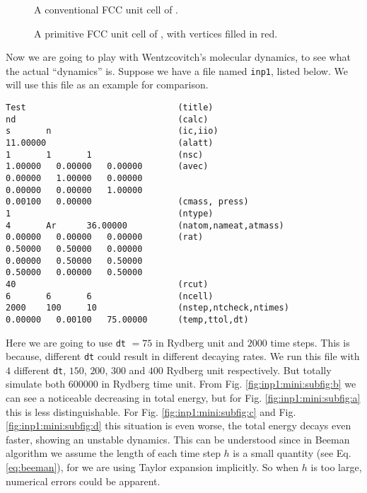 \begin{figure}[H]
	\begin{minipage}[t]{0.48\textwidth}
		\centering
		
		\caption{A conventional FCC unit cell of .}
		\label{fig:fcc1}
	\end{minipage}
	\hfill
	\begin {minipage}[t]{0.48\textwidth}
	\centering
	
	\caption{A primitive FCC unit cell of , with
		vertices filled in red.}
	\label{fig:fcc3}
	\end{minipage}
\end{figure}

Now we are going to play with Wentzcovitch's molecular dynamics, to see what the
actual ``dynamics'' is. Suppose we have a file named \texttt{inp1}, listed below.
We will use this file as an example for comparison.
\begin{verbatim}
Test                              (title)
nd                                (calc)
s       n                         (ic,iio)
11.00000                          (alatt)
1       1       1                 (nsc)
1.00000   0.00000   0.00000       (avec)
0.00000   1.00000   0.00000
0.00000   0.00000   1.00000
0.00100   0.00000                 (cmass, press)
1                                 (ntype)
4       Ar      36.00000          (natom,nameat,atmass)
0.00000   0.00000   0.00000       (rat)
0.50000   0.50000   0.00000
0.00000   0.50000   0.50000
0.50000   0.00000   0.50000
40                                (rcut)
6       6       6                 (ncell)
2000    100     10                (nstep,ntcheck,ntimes)
0.00000   0.00100   75.00000      (temp,ttol,dt)
\end{verbatim}

\newpage
Here we are going to use \texttt{dt} $= 75$ in Rydberg unit and $2000$ time steps. This is because, different \texttt{dt} could result in different decaying rates.
We run this file with $4$ different \texttt{dt}, $150$, $200$, $300$ and $400$
Rydberg unit respectively.
But totally simulate both $600000$ in Rydberg time unit. From Fig. \ref{fig:inp1:mini:subfig:b} we can see a noticeable
decreasing in total energy, but for Fig. \ref{fig:inp1:mini:subfig:a} this is less distinguishable. For Fig. \ref{fig:inp1:mini:subfig:c} and Fig. \ref{fig:inp1:mini:subfig:d}
this situation is even worse, the total energy decays even faster, showing an unstable dynamics. This can be understood since in
Beeman algorithm we assume the length of each time step $h$ is a small quantity (see Eq. \eqref{eq:beeman}),
for we are using Taylor expansion implicitly. So when $h$ is too large, numerical errors
could be apparent.

